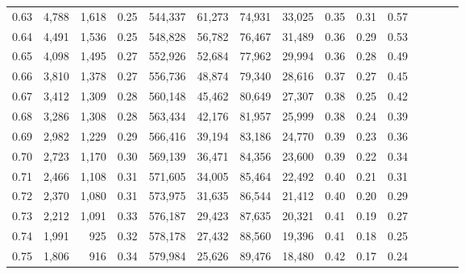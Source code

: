 \begin{tabular}{rrrcrrrrrrrrrrr}
0.63 &   4,788 &  1,618 &                                       0.25 &  544,337 &   61,273 &   74,931 &   33,025 &  0.35 &  0.31 &                         0.57 \\
0.64 &   4,491 &  1,536 &                                       0.25 &  548,828 &   56,782 &   76,467 &   31,489 &  0.36 &  0.29 &                         0.53 \\
0.65 &   4,098 &  1,495 &                                       0.27 &  552,926 &   52,684 &   77,962 &   29,994 &  0.36 &  0.28 &                         0.49 \\
0.66 &   3,810 &  1,378 &                                       0.27 &  556,736 &   48,874 &   79,340 &   28,616 &  0.37 &  0.27 &                         0.45 \\
0.67 &   3,412 &  1,309 &                                       0.28 &  560,148 &   45,462 &   80,649 &   27,307 &  0.38 &  0.25 &                         0.42 \\
0.68 &   3,286 &  1,308 &                                       0.28 &  563,434 &   42,176 &   81,957 &   25,999 &  0.38 &  0.24 &                         0.39 \\
0.69 &   2,982 &  1,229 &                                       0.29 &  566,416 &   39,194 &   83,186 &   24,770 &  0.39 &  0.23 &                         0.36 \\
0.70 &   2,723 &  1,170 &                                       0.30 &  569,139 &   36,471 &   84,356 &   23,600 &  0.39 &  0.22 &                         0.34 \\
0.71 &   2,466 &  1,108 &                                       0.31 &  571,605 &   34,005 &   85,464 &   22,492 &  0.40 &  0.21 &                         0.31 \\
0.72 &   2,370 &  1,080 &                                       0.31 &  573,975 &   31,635 &   86,544 &   21,412 &  0.40 &  0.20 &                         0.29 \\
0.73 &   2,212 &  1,091 &                                       0.33 &  576,187 &   29,423 &   87,635 &   20,321 &  0.41 &  0.19 &                         0.27 \\
0.74 &   1,991 &    925 &                                       0.32 &  578,178 &   27,432 &   88,560 &   19,396 &  0.41 &  0.18 &                         0.25 \\
0.75 &   1,806 &    916 &                                       0.34 &  579,984 &   25,626 &   89,476 &   18,480 &  0.42 &  0.17 &                         0.24 \\

\end{tabular}
